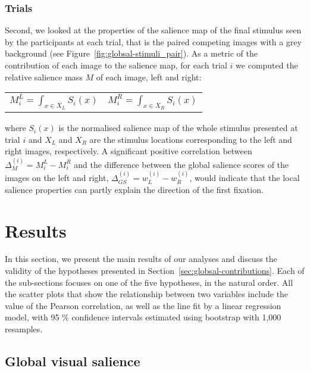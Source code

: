 {\subsubsection{Trials}

Second, we looked at the properties of the salience map of the final stimulus seen by the participants at each trial, that is the paired competing images with a grey background (see Figure~\ref{fig:globsal-stimuli_pair}). As a metric of the contribution of each image to the salience map, for each trial $i$ we computed the relative salience mass $M$ of each image, left and right:

\begin{table}[ht]
\centering
\label{tab:salience_mass}
  \begin{tabular}{cc}
    $M_{i}^{L} = \int_{x \in X_{L}} S_{i}(x)$ & $M_{i}^{R} = \int_{x \in X_{R}} S_{i}(x)$
  \end{tabular}
\end{table}
%
where $S_{i}(x)$ is the normalised salience map of the whole stimulus presented at trial $i$ and $X_{L}$ and $X_{R}$ are the stimulus locations corresponding to the left and right images, respectively. A significant positive correlation between $\Delta_{M}^{(i)} = M_{i}^{L} - M_{i}^{R}$ and the difference between the global salience scores of the images on the left and right, $\Delta_{GS}^{(i)}= w_{L}^{(i)} - w_{R}^{(i)}$, would indicate that the local salience properties can partly explain the direction of the first fixation.

\section{Results}
\label{sec:results}

In this section, we present the main results of our analyses and discuss the validity of the hypotheses presented in Section~\ref{sec:globsal-contributions}. Each of the sub-sections focuses on one of the five hypotheses, in the natural order. All the scatter plots that show the relationship between two variables include the value of the Pearson correlation, as well as the line fit by a linear regression model, with 95 \% confidence intervals estimated using bootstrap with 1,000 resamples.

\subsection{Global visual salience}
\label{sec:results-global_salience}

}
